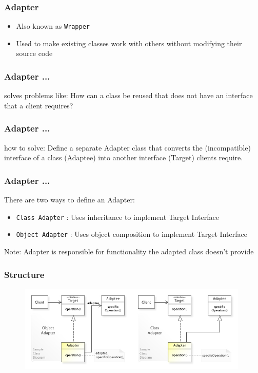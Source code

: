 \documentclass{beamer}
\begin{document}
\begin{frame}[fragile]
\frametitle{Adapter}

\begin{itemize}
\item Also known as \texttt{Wrapper}
\item Used to make existing classes work with others without modifying their source code
\end{itemize}

\end{frame}

\begin{frame}[fragile]
\frametitle{Adapter ...}

\begin{block}{solves problems like:}
    How can a class be reused that does not have an interface that a client requires?
\end{block}

\end{frame}

\begin{frame}[fragile]
\frametitle{Adapter ...}

\begin{block}{how to solve:}
    Define a separate Adapter class that converts the (incompatible) 
    interface of a class (Adaptee) into another interface (Target) clients require.
\end{block}

\end{frame}


\begin{frame}[fragile]
\frametitle{Adapter ...}
There are two ways to define an Adapter:
\begin{itemize}
    \item \texttt{Class Adapter} : Uses inheritance to implement Target Interface
    \item \texttt{Object Adapter} : Uses object composition to implement Target Interface
\end{itemize}

\begin{block}{Note:} 
Adapter is responsible for functionality the adapted class doesn't provide
\end{block}

\end{frame}


\begin{frame}[fragile]
\frametitle{Structure}

 \begin{figure}[ht]
       \includegraphics[width=11cm]{./images/adapter.jpg}
 \end{figure}

\end{frame}
\end{document}
